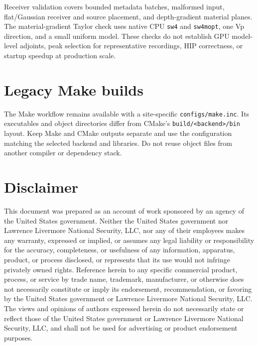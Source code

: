 \documentclass[11pt]{article}
\begin{document}
Receiver validation covers bounded metadata batches, malformed input,
flat/Gaussian receiver and source placement, and depth-gradient material
planes. The material-gradient Taylor check uses native CPU \texttt{sw4} and
\texttt{sw4mopt}, one Vp direction, and a small uniform model. These checks
do not establish GPU model-level adjoints, peak selection for representative
recordings, HIP correctness, or startup speedup at production scale.

\section{Legacy Make builds}
The Make workflow remains available with a site-specific
\texttt{configs/make.inc}. Its executables and object directories differ
from CMake's \texttt{build/<backend>/bin} layout. Keep Make and CMake outputs
separate and use the configuration matching the selected backend and libraries.
Do not reuse object files from another compiler or dependency stack.

\section{Disclaimer} 
This document was prepared as an account of work sponsored by an agency of the United States
government. Neither the United States government nor Lawrence Livermore National Security, LLC, nor
any of their employees makes any warranty, expressed or implied, or assumes any legal liability or
responsibility for the accuracy, completeness, or usefulness of any information, apparatus, product,
or process disclosed, or represents that its use would not infringe privately owned
rights. Reference herein to any specific commercial product, process, or service by trade name,
trademark, manufacturer, or otherwise does not necessarily constitute or imply its endorsement,
recommendation, or favoring by the United States government or Lawrence Livermore National Security,
LLC. The views and opinions of authors expressed herein do not necessarily state or reflect those of
the United States government or Lawrence Livermore National Security, LLC, and shall not be used for
advertising or product endorsement purposes. 
\end{document}
